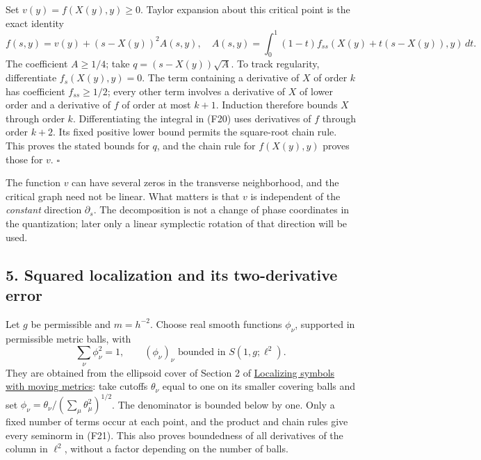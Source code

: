 \documentclass[
  11pt,
]{article}
\makeatletter
\let\ReaderOriginalAnchorStart\hyper@anchorstart
\let\ReaderOriginalAnchorEnd\hyper@anchorend
\let\ReaderPendingAliases\@empty
\def\ReaderArmAliases#1{\gdef\ReaderPendingAliases{#1}}
\def\hyper@anchorstart#1{\ReaderIfNativeAnchorTF{#1}{\ReaderPendingAliases\global\let\ReaderPendingAliases\@empty}{}\ReaderOriginalAnchorStart{#1}}
\makeatother
\begin{document}
Set \(v(y)=f(X(y),y)\geq0\). Taylor expansion about this critical point
is the exact identity \[
f(s,y)=v(y)+(s-X(y))^2 A(s,y),
\quad
A(s,y)=\int_0^1(1-t)
 f_{ss}(X(y)+t(s-X(y)),y)\,dt.
\tag{F20}
\] The coefficient \(A\geq1/4\); take \(q=(s-X(y))\sqrt A\). To track
regularity, differentiate \(f_s(X(y),y)=0\). The term containing a
derivative of \(X\) of order \(k\) has coefficient \(f_{ss}\geq1/2\);
every other term involves a derivative of \(X\) of lower order and a
derivative of \(f\) of order at most \(k+1\). Induction therefore bounds
\(X\) through order \(k\). Differentiating the integral in (F20) uses
derivatives of \(f\) through order \(k+2\). Its fixed positive lower
bound permits the square-root chain rule. This proves the stated bounds
for \(q\), and the chain rule for \(f(X(y),y)\) proves those for \(v\).
\(\square\)

The function \(v\) can have several zeros in the transverse
neighborhood, and the critical graph need not be linear. What matters is
that \(v\) is independent of the \emph{constant} direction
\(\partial_s\). The decomposition is not a change of phase coordinates
in the quantization; later only a linear symplectic rotation of that
direction will be used.

\ReaderArmAliases{\ReaderOriginalAnchorStart{AN03-SFP-005}\ReaderOriginalAnchorEnd\begingroup\expandafter\def\csname @currentHref\endcsname{AN03-SFP-005}\label{AN03-SFP-005}\endgroup\ReaderOriginalAnchorStart{an03-sfp-005-squared-localization-and-its-two-derivative-error}\ReaderOriginalAnchorEnd\begingroup\expandafter\def\csname @currentHref\endcsname{an03-sfp-005-squared-localization-and-its-two-derivative-error}\label{an03-sfp-005-squared-localization-and-its-two-derivative-error}\endgroup\ReaderOriginalAnchorStart{5-squared-localization-and-its-two-derivative-error}\ReaderOriginalAnchorEnd\begingroup\expandafter\def\csname @currentHref\endcsname{5-squared-localization-and-its-two-derivative-error}\label{5-squared-localization-and-its-two-derivative-error}\endgroup\ReaderOriginalAnchorStart{squared-localization-and-its-two-derivative-error}\ReaderOriginalAnchorEnd}
\subsection{5. Squared localization and its two-derivative
error}\label{squared-localization-and-its-two-derivative-error}

Let \(g\) be permissible and \(m=h^{-2}\). Choose real smooth functions
\(\phi_\nu\), supported in permissible metric balls, with \[
\sum_\nu\phi_\nu^2=1,
\qquad (\phi_\nu)_\nu\text{ bounded in }S(1,g;\ell^2).
\tag{F21}
\] They are obtained from the ellipsoid cover of Section 2 of
\href{metric-localization.pdf}{Localizing symbols with moving metrics}:
take cutoffs \(\theta_\nu\) equal to one on its smaller covering balls
and set \(\phi_\nu=\theta_\nu/(\sum_\mu\theta_\mu^2)^{1/2}\). The
denominator is bounded below by one. Only a fixed number of terms occur
at each point, and the product and chain rules give every seminorm in
(F21). This also proves boundedness of all derivatives of the column in
\(\ell^2\), without a factor depending on the number of balls.
\end{document}
